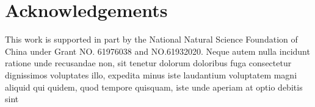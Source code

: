 \documentclass[letterpaper]{article} %
\begin{document}
\section*{Acknowledgements}
This work is supported in part by the National Natural Science Foundation of China under Grant NO. 61976038 and NO.61932020.
%
Neque autem nulla incidunt ratione unde recusandae non, sit tenetur dolorum doloribus fuga consectetur dignissimos voluptates illo, expedita minus iste laudantium voluptatem magni aliquid qui quidem, quod tempore quisquam, iste unde aperiam at optio debitis sint

\end{document}
